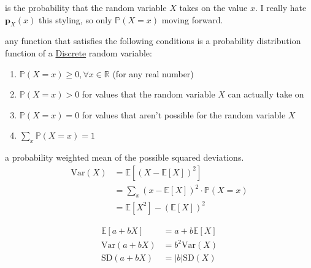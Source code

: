 \documentclass[10pt,landscape]{article}
\newcommand{\Blue}[1]{\noindent{\textbf{\textcolor{Blue}{#1 -}}}}
\newcommand{\Red}[1]{\noindent{\textbf{\textcolor{BrickRed}{#1 -}}}}
\newcommand{\Green}[1]{\noindent{\textbf{\textcolor{PineGreen}{#1 -}}}}
\begin{document}
\begin{multicols}{4}
\Red{Probability Distribution Function (PDF)}  is the probability that the
random variable $X$ takes on the value $x$. I really hate $\mathbf{p}_X(x)$ this styling, so only $\mathbb{P}(X = x)$
moving forward.

\Blue{Properties of PDFs} any function that satisfies the following conditions is a probability distribution function of
a \underline{Discrete} random variable:
\begin{enumerate}
    \item $\mathbb{P}(X = x) \ge 0, \forall x \in \mathbb{R}$ (for any real number)
    \item $\mathbb{P}(X = x) > 0$ for values that the random variable $X$ can actually take on
    \item $\mathbb{P}(X = x) = 0$ for values that aren't possible for the random variable $X$
    \item $\sum_x \mathbb{P}(X = x) = 1$
\end{enumerate}

\Red{Expected Value} 

\Red{Variance} a probability weighted mean of the possible squared deviations.
\begin{displaymath}
    \boxed{
        \begin{aligned}
            \text{Var}(X) &= \mathbb{E}\left[(X - \mathbb{E}[X])^2\right]\\
            &= \sum_x (x - \mathbb{E}[X])^2 \cdot \mathbb{P}(X = x) \\
            &= \mathbb{E}\left[X^2\right] - \left(\mathbb{E}\left[X\right]\right)^2
        \end{aligned}
    }
\end{displaymath}

\Red{Standard Deviation} 

\Green{Handy Transformations}
\begin{displaymath}
    \boxed{
        \begin{aligned}
            \mathbb{E}\left[a + b X\right] &= a + b\mathbb{E}\left[X\right] \\
            \text{Var}(a + b X) &= b^2 \text{Var}(X) \\
            \text{SD}(a + b X) &= |b| \text{SD}(X)
        \end{aligned}
    }
\end{displaymath}


\end{multicols}
\end{document}
